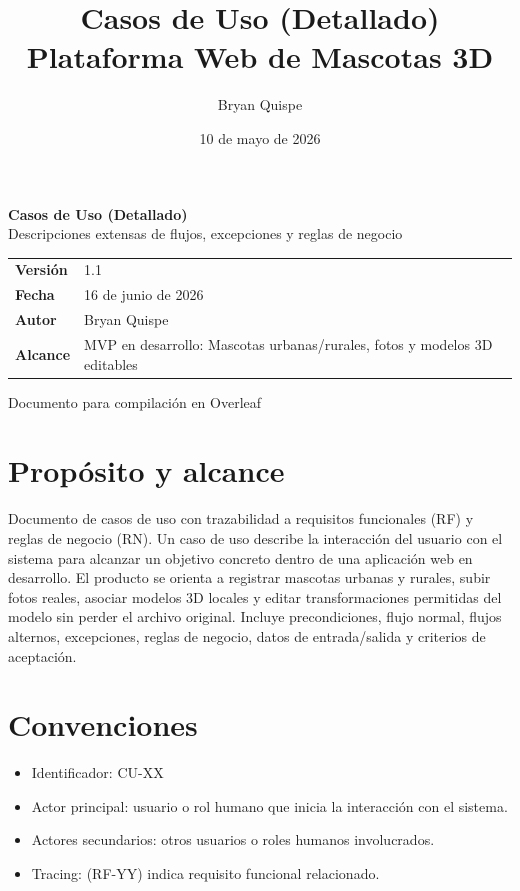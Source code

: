 \documentclass[12pt,a4paper]{article}
\title{\Huge\textbf{Casos de Uso (Detallado)}\\[0.3em]\Large Plataforma Web de Mascotas 3D}
\author{Bryan Quispe}
\date{10 de mayo de 2026}
\begin{document}
\begin{titlepage}
\centering
\vspace*{1.8cm}
{\Huge\bfseries\color{PrimaryBlue} Casos de Uso (Detallado)\\[0.35em]}
{\LARGE Descripciones extensas de flujos, excepciones y reglas de negocio\\[1.2cm]}

\begin{tabular}{p{5cm} p{8cm}}
\rowcolor{SoftGray}
\textbf{Versi\'on} & 1.1 \\
\textbf{Fecha} & 16 de junio de 2026 \\
\textbf{Autor} & Bryan Quispe \\
\textbf{Alcance} & MVP en desarrollo: Mascotas urbanas/rurales, fotos y modelos 3D editables \\
\end{tabular}

\vfill
{\large Documento para compilaci\'on en Overleaf}
\end{titlepage}

\tableofcontents
\newpage

\section{Prop\'osito y alcance}
Documento de casos de uso con trazabilidad a requisitos funcionales (RF) y reglas de negocio (RN). Un caso de uso describe la interacci\'on del usuario con el sistema para alcanzar un objetivo concreto dentro de una aplicaci\'on web en desarrollo. El producto se orienta a registrar mascotas urbanas y rurales, subir fotos reales, asociar modelos 3D locales y editar transformaciones permitidas del modelo sin perder el archivo original. Incluye precondiciones, flujo normal, flujos alternos, excepciones, reglas de negocio, datos de entrada/salida y criterios de aceptaci\'on.

\section{Convenciones}
\begin{itemize}[leftmargin=*]
    \item Identificador: CU-XX
    \item Actor principal: usuario o rol humano que inicia la interacci\'on con el sistema.
    \item Actores secundarios: otros usuarios o roles humanos involucrados.
    \item Tracing: (RF-YY) indica requisito funcional relacionado.
\end{itemize}
\end{document}
